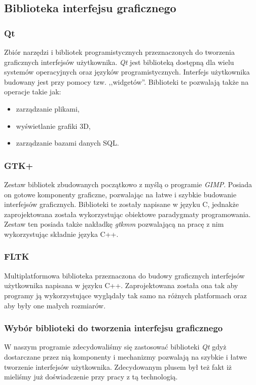 \documentclass[twoside]{projektInzynierskiMS}
\begin{document}
\subsection{Biblioteka interfejsu graficznego}

\subsubsection{Qt}
Zbiór narzędzi i bibliotek programistycznych przeznaczonych do tworzenia graficznych interfejsów użytkownika. \emph{Qt} jest biblioteką dostępną dla wielu systemów operacyjnych oraz języków programistycznych. Interfejs użytkownika budowany jest przy pomocy tzw. ,,widgetów''. Biblioteki te pozwalają także na operacje takie jak: 
\begin{itemize}
	\item zarządzanie plikami,
	\item wyświetlanie grafiki 3D,
	\item zarządzanie bazami danych SQL.
\end{itemize}
\subsubsection{GTK+}
Zestaw bibliotek zbudowanych początkowo z myślą o programie \emph{GIMP}. Posiada on gotowe komponenty graficzne, pozwalając na łatwe i szybkie budowanie interfejsów graficznych. Biblioteki te zostały napisane w języku C, jednakże zaprojektowana została wykorzystując obiektowe paradygmaty programowania. Zestaw ten posiada także nakładkę \emph{gtkmm} pozwalającą na pracę z nim wykorzystując składnie języka C++.
\subsubsection{FLTK}
Multiplatformowa biblioteka przeznaczona do budowy graficznych interfejsów użytkownika napisana w języku C++. Zaprojektowana została ona tak aby programy ją wykorzystujące wyglądały tak samo na różnych platformach oraz aby były one małych rozmiarów.
\subsubsection{Wybór biblioteki do tworzenia interfejsu graficznego}
W naszym programie zdecydowaliśmy się zastosować biblioteki \emph{Qt} gdyż dostarczane przez nią komponenty i mechanizmy pozwalają na szybkie i łatwe tworzenie interfejsów użytkownika. Zdecydowanym plusem był też fakt iż mieliśmy już doświadczenie przy pracy z tą technologią.
\end{document}
